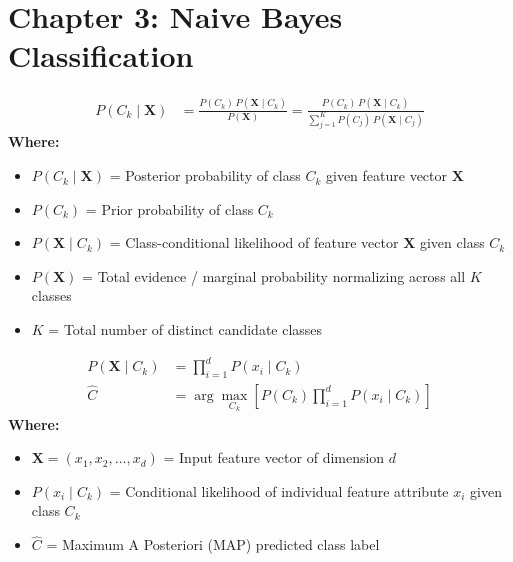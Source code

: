 \section*{Chapter 3: Naive Bayes Classification}

\begin{formulabox}
\begin{align*}
    P(C_k \mid \mathbf{X}) &= \frac{P(C_k) \, P(\mathbf{X} \mid C_k)}{P(\mathbf{X})} = \frac{P(C_k) \, P(\mathbf{X} \mid C_k)}{\sum_{j=1}^K P(C_j) \, P(\mathbf{X} \mid C_j)}
\end{align*}
\textbf{Where:}
\begin{itemize}[noitemsep, topsep=1pt]
    \item $P(C_k \mid \mathbf{X})$ = Posterior probability of class $C_k$ given feature vector $\mathbf{X}$
    \item $P(C_k)$ = Prior probability of class $C_k$
    \item $P(\mathbf{X} \mid C_k)$ = Class-conditional likelihood of feature vector $\mathbf{X}$ given class $C_k$
    \item $P(\mathbf{X})$ = Total evidence / marginal probability normalizing across all $K$ classes
    \item $K$ = Total number of distinct candidate classes
\end{itemize}
\end{formulabox}

\begin{formulabox}
\begin{align*}
    P(\mathbf{X} \mid C_k) &= \prod_{i=1}^d P(x_i \mid C_k) \\[2pt]
    \hat{C} &= \arg\max_{C_k} \left[ P(C_k) \prod_{i=1}^d P(x_i \mid C_k) \right]
\end{align*}
\textbf{Where:}
\begin{itemize}[noitemsep, topsep=1pt]
    \item $\mathbf{X} = (x_1, x_2, \dots, x_d)$ = Input feature vector of dimension $d$
    \item $P(x_i \mid C_k)$ = Conditional likelihood of individual feature attribute $x_i$ given class $C_k$
    \item $\hat{C}$ = Maximum A Posteriori (MAP) predicted class label
\end{itemize}
\end{formulabox}

